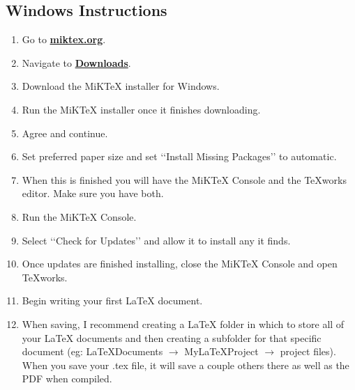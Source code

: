 \documentclass{article}
\begin{document}
		\subsection{Windows Instructions}
			\begin{enumerate}
				\item Go to \href{https://miktex.org/}{\textbf{miktex.org}}.
				\item Navigate to \href{https://miktex.org/download}{\textbf{Downloads}}.
				\item Download the MiKTeX installer for Windows.
				\item Run the MiKTeX installer once it finishes downloading.
				\item Agree and continue.
				\item Set preferred paper size and set \lq\lq{}Install Missing Packages\rq\rq{} to automatic.
				\item When this is finished you will have the MiKTeX Console and the TeXworks editor. Make sure you have both.
				\item Run the MiKTeX Console.
				\item Select \lq\lq{}Check for Updates\rq\rq{} and allow it to install any it finds.
				\item Once updates are finished installing, close the MiKTeX Console and open TeXworks.
				\item Begin writing your first \LaTeX{} document.
				\item When saving, I recommend creating a LaTeX folder in which to store all of your \LaTeX{} documents and then creating a subfolder for that specific document (eg: LaTeXDocuments \(\rightarrow\) MyLaTeXProject \(\rightarrow\) project files). When you save your .tex file, it will save a couple others there as well as the PDF when compiled.
			\end{enumerate}
\end{document}
